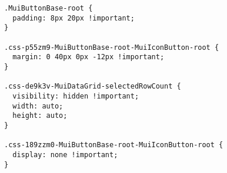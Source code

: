 \begin{verbatim}
.MuiButtonBase-root {
  padding: 8px 20px !important;
}

.css-p55zm9-MuiButtonBase-root-MuiIconButton-root {
  margin: 0 40px 0px -12px !important;
}

.css-de9k3v-MuiDataGrid-selectedRowCount {
  visibility: hidden !important;
  width: auto;
  height: auto;
}

.css-189zzm0-MuiButtonBase-root-MuiIconButton-root {
  display: none !important;
}

\end{verbatim}